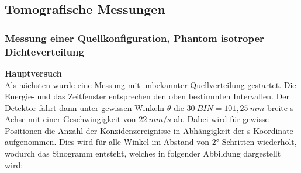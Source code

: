     \subsection{Tomografische Messungen}
    	\subsubsection{Messung einer Quellkonfiguration, Phantom isotroper Dichteverteilung}
    	        \textbf{Hauptversuch}\\
    	        
    	        Als nächsten wurde eine Messung mit unbekannter Quellverteilung gestartet. Die Energie- und das Zeitfenster entsprechen den oben bestimmten Intervallen. Der Detektor fährt dann unter gewissen Winkeln $\theta$ die $30\ \unit{BIN} = 101,25\ \unit{mm}$ breite s-Achse mit einer Geschwingigkeit von $22\ \unit{mm/s}$ ab. Dabei wird für gewisse Positionen die Anzahl der Konzidenzereignisse in Abhängigkeit der s-Koordinate aufgenommen. Dies wird für alle Winkel im Abstand von $2\unit{°}$ Schritten wiederholt, wodurch das Sinogramm entsteht, welches in folgender Abbildung dargestellt wird:\\ 
    				
